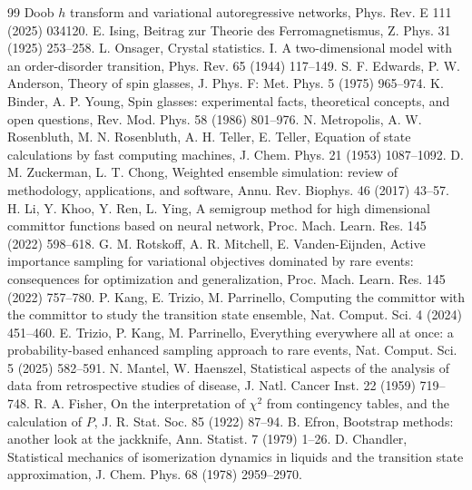 \documentclass[a4paper,fleqn]{cas-sc}
\begin{document}
\begin{thebibliography}{99}
Doob $h$ transform and variational autoregressive networks, Phys. Rev. E 111 (2025) 034120.
 E. Ising, Beitrag zur Theorie des Ferromagnetismus, Z. Phys. 31 (1925)
253--258.
 L. Onsager, Crystal statistics. I. A two-dimensional model with an
order-disorder transition, Phys. Rev. 65 (1944) 117--149.
 S. F. Edwards, P. W. Anderson, Theory of spin glasses, J. Phys. F: Met.
Phys. 5 (1975) 965--974.
 K. Binder, A. P. Young, Spin glasses: experimental facts, theoretical
concepts, and open questions, Rev. Mod. Phys. 58 (1986) 801--976.
 N. Metropolis, A. W. Rosenbluth, M. N. Rosenbluth, A. H. Teller,
E. Teller, Equation of state calculations by fast computing machines, J. Chem. Phys. 21 (1953)
1087--1092.
 D. M. Zuckerman, L. T. Chong, Weighted ensemble simulation: review of
methodology, applications, and software, Annu. Rev. Biophys. 46 (2017) 43--57.
 H. Li, Y. Khoo, Y. Ren, L. Ying, A semigroup method for high dimensional committor
functions based on neural network, Proc. Mach. Learn. Res. 145 (2022) 598--618.
 G. M. Rotskoff, A. R. Mitchell, E. Vanden-Eijnden, Active importance
sampling for variational objectives dominated by rare events: consequences for optimization and
generalization, Proc. Mach. Learn. Res. 145 (2022) 757--780.
 P. Kang, E. Trizio, M. Parrinello, Computing the committor with the committor to
study the transition state ensemble, Nat. Comput. Sci. 4 (2024) 451--460.
 E. Trizio, P. Kang, M. Parrinello, Everything everywhere all at once: a
probability-based enhanced sampling approach to rare events, Nat. Comput. Sci. 5 (2025)
582--591.
 N. Mantel, W. Haenszel, Statistical aspects of the analysis of data from
retrospective studies of disease, J. Natl. Cancer Inst. 22 (1959) 719--748.
 R. A. Fisher, On the interpretation of $\chi^2$ from contingency tables,
and the calculation of $P$, J. R. Stat. Soc. 85 (1922) 87--94.
 B. Efron, Bootstrap methods: another look at the jackknife, Ann. Statist.
7 (1979) 1--26.
 D. Chandler, Statistical mechanics of isomerization dynamics in liquids and
the transition state approximation, J. Chem. Phys. 68 (1978) 2959--2970.
\end{thebibliography}
\end{document}

